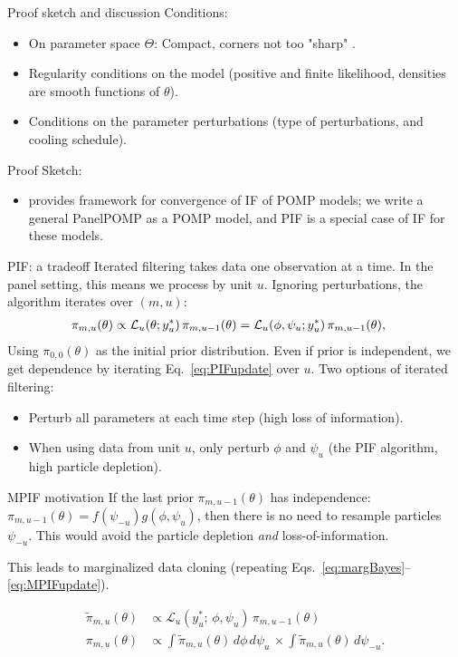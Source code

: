 \documentclass[aspectratio=169]{beamer}\usepackage[]{graphicx}\usepackage[]{xcolor}
\begin{document}
\begin{frame}{Proof sketch and discussion}
  Conditions:
  \begin{itemize}
    \item On parameter space $\Theta$: Compact, corners not too "sharp" \citep[regular compact set, Def~1 of][]{chen24}.
    \item Regularity conditions on the model (positive and finite likelihood, densities are smooth functions of $\theta$). 
    \item Conditions on the parameter perturbations (type of perturbations, and cooling schedule). 
  \end{itemize}
  Proof Sketch: 
  \begin{itemize}
    \item \citet{chen24} provides framework for convergence of IF of POMP models; we write a general PanelPOMP as a POMP model, and PIF is a special case of IF for these models. 
  \end{itemize}
\end{frame}

\begin{frame}{PIF: a tradeoff}
  Iterated filtering takes data one observation at a time. 
  In the panel setting, this means we process by unit $u$. 
  Ignoring perturbations, the algorithm iterates over $(m, u)$: 
  \begin{align}
    \pi_{m, u}(\theta) &\propto \mathcal{L}_u(\theta; y_u^*)\, \pi_{m, u-1}(\theta) = \mathcal{L}_u(\phi, \psi_u; y_u^*)\, \pi_{m, u-1}(\theta), \label{eq:PIFupdate}
  \end{align}
    Using $\pi_{0, 0}(\theta)$ as the initial prior distribution. Even if prior is independent, we get dependence by iterating Eq.~\ref{eq:PIFupdate} over $u$. Two options of iterated filtering: 
    \begin{itemize}
      \item Perturb all parameters at each time step (high loss of information). 
      \item When using data from unit $u$, only perturb $\phi$ and $\psi_u$ (the PIF algorithm, high particle depletion). 
    \end{itemize}
\end{frame}

\begin{frame}{MPIF motivation}
  If the last prior $\pi_{m, u-1}(\theta)$ has independence: $\pi_{m, u-1}(\theta) = f(\psi_{-u})g(\phi, \psi_{u})$, then there is no need to resample particles $\psi_{-u}$. This would avoid the particle depletion \emph{and} loss-of-information.
  
  This leads to marginalized data cloning (repeating Eqs.~\ref{eq:margBayes}--\ref{eq:MPIFupdate}). 
  
  \begin{align}
\tilde{\pi}_{m, u}(\theta) &\propto \mathcal{L}_{u}(y^*_u;\, \phi, \psi_u)\, \pi_{m, u-1}(\theta) \label{eq:margBayes}\\
\pi_{m, u}(\theta) &\propto \int \! \tilde{\pi}_{m, u}(\theta) \, d\phi \, d\psi_u \, \times \int \! \tilde{\pi}_{m, u}(\theta) \, d\psi_{-u} \label{eq:MPIFupdate}.
\end{align}
\end{frame}
\end{document}
